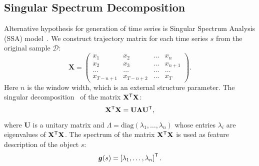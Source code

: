 \subsection{Singular Spectrum Decomposition}
Alternative hypothesis for generation of time series is Singular Spectrum Analysis (SSA) model~\cite{hassani2007singular}. We construct trajectory matrix for each time series $s$ from the original sample $\mathcal{D}$:
\[
\mathbf{X} = 
\begin{pmatrix}
x_1 & x_2 & \dots & x_n \\
x_2 & x_3 & \dots & x_{n+1} \\
\dots & \dots & \dots & \dots \\
x_{T-n+1} & x_{T-n+2} & \dots & x_T
\end{pmatrix}.
\]
Here $n$ is the window width, which is an external structure parameter.
The singular decomposition~\cite{golub1970singular} of the matrix $\mathbf{X}^{{\mbox{\scriptsize\sffamily\upshape\mdseries T}}} \mathbf{X}$:
\[
\mathbf{X}^{{\mbox{\scriptsize\sffamily\upshape\mdseries T}}} \mathbf{X} = \mathbf{U} \mathbf{\Lambda} \mathbf{U}^{{\mbox{\scriptsize\sffamily\upshape\mdseries T}}},
\]
where $\mathbf{U}$ is a unitary matrix and $\Lambda = \mathrm{diag}(\lambda_1, \dots, \lambda_n)$ whose entries $\lambda_i$ are eigenvalues of $\mathbf{X}^{{\mbox{\scriptsize\sffamily\upshape\mdseries T}}} \mathbf{X}$. 
The spectrum of the matrix $\mathbf{X}^{{\mbox{\scriptsize\sffamily\upshape\mdseries T}}} \mathbf{X}$ is used as feature description of the object $s$:
\[
\bm{g}(s) = \left[\lambda_1, \dots, \lambda_n\right]^{{\mbox{\scriptsize\sffamily\upshape\mdseries T}}}.
\]
